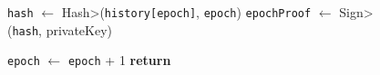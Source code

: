 \begin{figure}[t!]
\begin{adjustbox}{minipage=[t]{\columnwidth}}
\begin{algorithm}[H]
\begin{algorithmic}[1]
                	\State \texttt{hash} $\leftarrow$ \<Hash>(\texttt{history[epoch]}, \texttt{epoch})
                \State \texttt{epochProof} $\leftarrow$  \<Sign>(\texttt{hash}, privateKey)
                \State {}
                	
                	\State \texttt{epoch} $\leftarrow$ \texttt{epoch} + 1
                \State \textbf{return}
            \EndFunction
        \end{algorithmic}
      \end{algorithm}
	\end{adjustbox}
  \end{figure}


